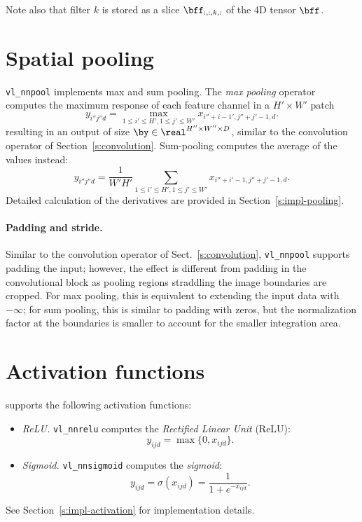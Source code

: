 Note also that filter $k$ is stored as a slice $\bff_{:,:,k,:}$ of the 4D tensor $\bff$.

\section{Spatial pooling}\label{s:pooling}

\verb!vl_nnpool! implements max and sum pooling. The \emph{max pooling} operator computes the maximum response of each feature channel in a $H' \times W'$ patch
\[
y_{i''j''d} = \max_{1\leq i' \leq H', 1 \leq j' \leq W'} x_{i''+i-1',j''+j'-1,d}.
\]
resulting in an output of size $\by\in\real^{H''\times W'' \times D}$, similar to the convolution operator of Section~\ref{s:convolution}. Sum-pooling computes the average of the values instead:
\[
y_{i''j''d} = \frac{1}{W'H'}
\sum_{1\leq i' \leq H', 1 \leq j' \leq W'} x_{i''+i'-1,j''+j'-1,d}.
\]
Detailed calculation of the derivatives are provided in Section~\ref{s:impl-pooling}.

\paragraph{Padding and stride.} Similar to the convolution operator of Sect.~\ref{s:convolution}, \verb!vl_nnpool! supports padding the input; however, the effect is different from padding in the convolutional block as pooling regions straddling the image boundaries are cropped. For max pooling, this is equivalent to extending the input data with $-\infty$; for sum pooling, this is similar to padding with zeros, but the normalization factor at the boundaries is smaller to account for the smaller integration area.

\section{Activation functions}\label{s:activation}

\vlnn supports the following activation functions:
%
\begin{itemize}
\item \emph{ReLU.} \verb!vl_nnrelu! computes the \emph{Rectified Linear Unit} (ReLU):
\[
 y_{ijd} = \max\{0, x_{ijd}\}.
\]

\item \emph{Sigmoid.} \verb!vl_nnsigmoid! computes the \emph{sigmoid}:
\[
 y_{ijd} = \sigma(x_{ijd}) = \frac{1}{1+e^{-x_{ijd}}}.
\]
\end{itemize}
%
See Section~\ref{s:impl-activation} for implementation details.

